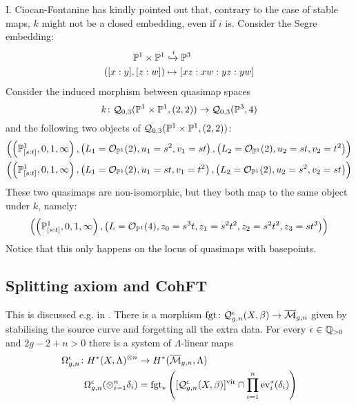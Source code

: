 \begin{rmk}
I. Ciocan-Fontanine has kindly pointed out that, contrary to the case of stable maps, $k$ might not be a closed embedding, even if $i$ is. Consider the Segre embedding:
\begin{align*}
\mathbb P^1\times\mathbb P^1 & \xhookrightarrow{i} \mathbb P^3\\ 
([x:y],[z:w]) & \mapsto [xz:xw:yz:yw]\end{align*}
Consider the induced morphism between quasimap spaces
\begin{equation*} k\colon \mathcal{Q}_{0,3}(\mathbb P^1\times\mathbb P^1,(2,2))\rightarrow\mathcal{Q}_{0,3}(\mathbb P^3,4) \end{equation*}
and the following two objects of $\mathcal{Q}_{0,3}(\mathbb P^1 \times \mathbb P^1,(2,2))$:
\begin{align*}
  \left(\left(\mathbb P^1_{[s:t]},0,1,\infty\right),\left(L_1=\mathcal{O}_{\mathbb P^1}(2),u_1=s^2 ,v_1=st\right),\left(L_2=\mathcal{O}_{\mathbb P^1}(2), u_2=st,v_2=t^2\right)\right)\\
  \left(\left(\mathbb P^1_{[s:t]},0,1,\infty\right),\left(L_1=\mathcal{O}_{\mathbb P^1}(2),u_1=st ,v_1=t^2 \right),\left(L_2=\mathcal{O}_{\mathbb P^1}(2), u_2=s^2,v_2=st\right)\right)
\end{align*}
These two quasimaps are non-isomorphic, but they both map to the same object under $k$, namely:
 \[
   \left(\left(\mathbb P^1_{[s:t]},0,1,\infty\right),\left(L=\mathcal{O}_{\mathbb P^1}(4),z_0=s^3t,z_1=s^2t^2,z_2=s^2t^2,z_3=st^3\right)\right)
 \]
Notice that this only happens on the locus of quasimaps with basepoints.
 \end{rmk}
\subsection{Splitting axiom and CohFT}\label{sec:cohFT}
This is discussed e.g. in \cite[\S 2.3.3]{CF-K-higher-genus}. There is a morphism $\operatorname{fgt}\colon \mathcal{Q}^{\epsilon}_{g,n}(X,\beta)\rightarrow \overline{\mathcal{M}}_{g,n}$ given by stabilising the source curve and forgetting all the extra data. For every $\epsilon\in\mathbb{Q}_{>0}$ and $2g-2+n>0$ there is a system of $\Lambda$-linear maps
\begin{align*}\Omega^\epsilon_{g,n}\colon H^*(X,\Lambda)^{\otimes n} & \rightarrow H^*(\overline{\mathcal{M}}_{g,n},\Lambda) \\
\Omega^\epsilon_{g,n}(\otimes_{i=1}^n\delta_i) & = \operatorname{fgt}_*\left([\mathcal{Q}^{\epsilon}_{g,n}(X,\beta)]^{\mathrm{vir}}\cap\prod_{i=1}^n\operatorname{ev}_i^*(\delta_i)\right) \end{align*}

